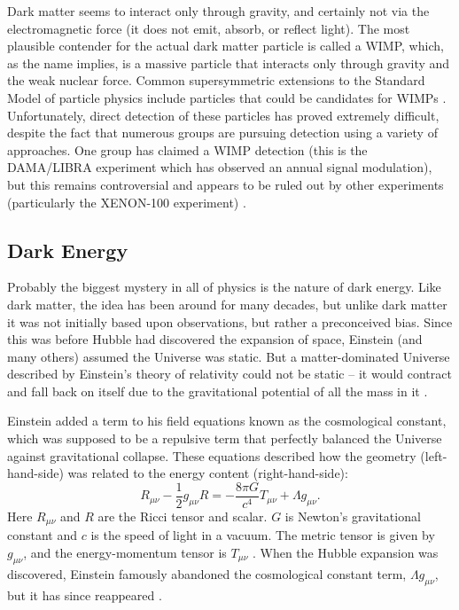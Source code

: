 Dark matter seems to interact only through gravity, and certainly not via the electromagnetic force (it does not emit, absorb, or reflect light). The most plausible contender for the actual dark matter particle is called a \acf{WIMP}, which, as the name implies, is a massive particle that interacts only through gravity and the weak nuclear force. Common supersymmetric extensions to the Standard Model of particle physics include particles that could be candidates for \ac{WIMP}s \citep{Schumann14}. Unfortunately, direct detection of these particles has proved extremely difficult, despite the fact that numerous groups are pursuing detection using a variety of approaches. One group has claimed a WIMP detection (this is the DAMA/LIBRA experiment which has observed an annual signal modulation), but this remains controversial and appears to be ruled out by other experiments (particularly the XENON-100 experiment) \citep{Snowmass13}.

\subsection{Dark Energy}
\label{sec:DE}

Probably the biggest mystery in all of physics is the nature of dark energy. Like dark matter, the idea has been around for many decades, but unlike dark matter it was not initially based upon observations, but rather a preconceived bias. Since this was before Hubble had discovered the expansion of space, Einstein (and many others) assumed the Universe was static. But a matter-dominated Universe described by Einstein's theory of relativity could not be static -- it would contract and fall back on itself due to the gravitational potential of all the mass in it \citep{Einstein17,Weinberg13}. 

Einstein added a term to his field equations known as the cosmological constant, which was supposed to be a repulsive term that perfectly balanced the Universe against gravitational collapse. These equations described how the geometry (left-hand-side) was related to the energy content (right-hand-side):
\begin{equation}
R_{\mu\nu} - \frac{1}{2} g_{\mu\nu} R =  -\frac{8\pi G}{c^4} T_{\mu\nu} + \Lambda g_{\mu\nu}.
\label{eq:Einstein}
\end{equation}
Here $R_{\mu\nu}$ and $R$ are the Ricci tensor and scalar. $G$ is Newton's gravitational constant and $c$ is the speed of light in a vacuum. The metric tensor is given by $g_{\mu\nu}$,  and the energy-momentum tensor is $T_{\mu\nu}$ \citep{Einstein17}. When the Hubble expansion was discovered, Einstein famously abandoned the cosmological constant term, $\Lambda g_{\mu\nu}$, but it has since reappeared \citep{Weinberg13}.

